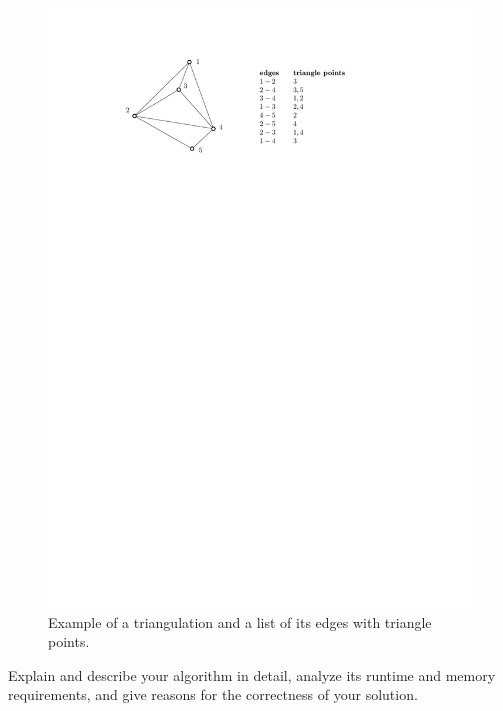 \documentclass[english]{scrartcl}
\begin{document}
\begin{figure}[H]
    \centering
    \includegraphics{img/plain.pdf}
    \caption{Example of a triangulation and a list of its edges with triangle points.}
    \label{fig:fig1}
\end{figure}
Explain and describe your algorithm in detail, analyze its runtime and memory requirements, and give reasons for the correctness of your solution.
\end{document}
